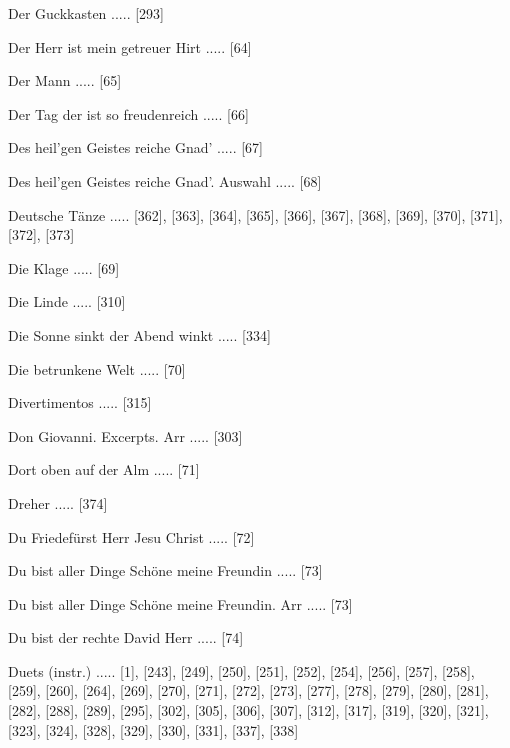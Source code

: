 \documentclass[twocolumn]{book}
\begin{document}
\newline 
Der Guckkasten ..... [293]

\newline 
Der Herr ist mein getreuer Hirt ..... [64]

\newline 
Der Mann ..... [65]

\newline 
Der Tag der ist so freudenreich ..... [66]

\newline 
Des heil'gen Geistes reiche Gnad' ..... [67]

\newline 
Des heil'gen Geistes reiche Gnad'. Auswahl ..... [68]

\newline 
Deutsche Tänze ..... [362], [363], [364], [365], [366], [367], [368], [369], [370], [371], [372], [373]

\newline 
Die Klage ..... [69]

\newline 
Die Linde ..... [310]

\newline 
Die Sonne sinkt der Abend winkt ..... [334]

\newline 
Die betrunkene Welt ..... [70]

\newline 
Divertimentos ..... [315]

\newline 
Don Giovanni. Excerpts. Arr ..... [303]

\newline 
Dort oben auf der Alm ..... [71]

\newline 
Dreher ..... [374]

\newline 
Du Friedefürst Herr Jesu Christ ..... [72]

\newline 
Du bist aller Dinge Schöne meine Freundin ..... [73]

\newline 
Du bist aller Dinge Schöne meine Freundin. Arr ..... [73]

\newline 
Du bist der rechte David Herr ..... [74]

\newline 
Duets (instr.) ..... [1], [243], [249], [250], [251], [252], [254], [256], [257], [258], [259], [260], [264], [269], [270], [271], [272], [273], [277], [278], [279], [280], [281], [282], [288], [289], [295], [302], [305], [306], [307], [312], [317], [319], [320], [321], [323], [324], [328], [329], [330], [331], [337], [338]
\end{document}
